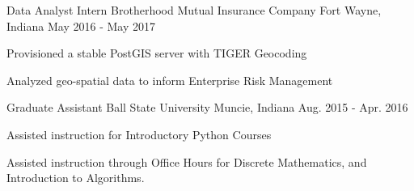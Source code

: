 \begin{cventries}
  \cventry
    {Data Analyst Intern} %
    {Brotherhood Mutual Insurance Company} %
    {Fort Wayne, Indiana} %
    {May 2016 - May 2017} %
    {
      \begin{cvitems} %
        \item {Provisioned a stable PostGIS server with TIGER Geocoding}
        \item {Analyzed geo-spatial data to inform Enterprise Risk Management}
      \end{cvitems}
    }

  \cventry
    {Graduate Assistant} %
    {Ball State University} %
    {Muncie, Indiana} %
    {Aug. 2015 - Apr. 2016} %
    {
      \begin{cvitems} %
        \item {Assisted instruction for Introductory Python Courses}
        \item {Assisted instruction through Office Hours for Discrete Mathematics, and Introduction to Algorithms.}
      \end{cvitems}
    }

\end{cventries}
